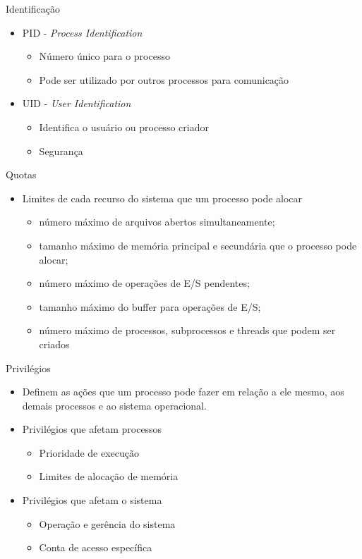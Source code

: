 \documentclass[aspectratio=169,
				xcolor=table]{beamer}
\begin{document}
	\begin{frame}{Identificação}
		\begin{itemize}
			\item PID - \textit{Process Identification}
			\begin{itemize}
				\item Número único para o processo
				\item Pode ser utilizado por outros processos para comunicação
			\end{itemize}
			\vspace{1em}
			\item UID - \textit{User Identification}
			\begin{itemize}
				\item Identifica o usuário ou processo criador 
				\item Segurança
			\end{itemize}
		\end{itemize}
	\end{frame}
	
	\begin{frame}{Quotas}
		\begin{itemize}
			\item Limites de cada recurso do sistema que um processo pode alocar
			\begin{itemize}
				\item número máximo de arquivos abertos simultaneamente; 
				\item tamanho máximo de memória principal e secundária que o processo pode alocar; 
				\item número máximo de operações de E/S pendentes; 
				\item tamanho máximo do buffer para operações de E/S; 
				\item número máximo de processos, subprocessos e threads que podem ser criados
			\end{itemize}
		\end{itemize}
	\end{frame}
	
	\begin{frame}{Privilégios}
		\begin{itemize}
			\item  Definem as ações que um processo pode fazer em relação a ele
mesmo, aos demais processos e ao sistema operacional.
			\vspace{1em}
			\item Privilégios que afetam processos
			\begin{itemize}
				\item Prioridade de execução
				\item Limites de alocação de memória
			\end{itemize}
			\vspace{1em}
			\item Privilégios que afetam o sistema
			\begin{itemize}
				\item Operação e gerência do sistema
				\item Conta de acesso específica
			\end{itemize}
		\end{itemize}
	\end{frame}
	
\end{document}

